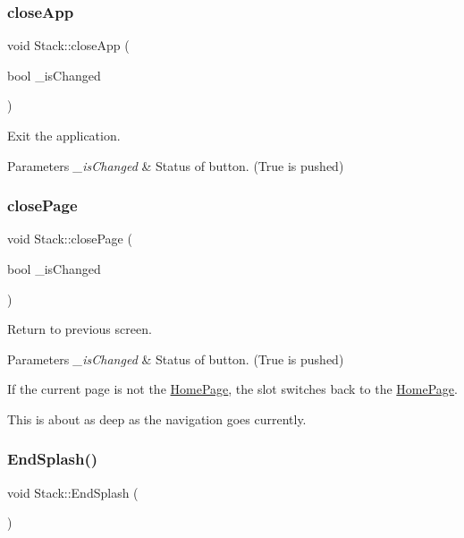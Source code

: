 \subsubsection{\texorpdfstring{closeApp}{closeApp}}
{\footnotesize\ttfamily void Stack\+::close\+App (\begin{DoxyParamCaption}\item[{bool}]{\+\_\+is\+Changed }\end{DoxyParamCaption})\hspace{0.3cm}{\ttfamily [slot]}}

Exit the application. 
\begin{DoxyParams}{Parameters}
{\em \+\_\+is\+Changed} & Status of button. (True is pushed) \\
\hline
\end{DoxyParams}
\mbox{\label{classStack_a69cd464c336cb480ad54ac2c83c309e1}} 
\subsubsection{\texorpdfstring{closePage}{closePage}}
{\footnotesize\ttfamily void Stack\+::close\+Page (\begin{DoxyParamCaption}\item[{bool}]{\+\_\+is\+Changed }\end{DoxyParamCaption})\hspace{0.3cm}{\ttfamily [slot]}}

Return to previous screen. 
\begin{DoxyParams}{Parameters}
{\em \+\_\+is\+Changed} & Status of button. (True is pushed)\\
\hline
\end{DoxyParams}
If the current page is not the \mbox{\hyperlink{classHomePage}{Home\+Page}}, the slot switches back to the \mbox{\hyperlink{classHomePage}{Home\+Page}}.

This is about as deep as the navigation goes currently. \mbox{\label{classStack_ac608632a7155f01a24a9713f5fde915e}} 
\subsubsection{\texorpdfstring{EndSplash()}{EndSplash()}}
{\footnotesize\ttfamily void Stack\+::\+End\+Splash (\begin{DoxyParamCaption}{ }\end{DoxyParamCaption})}

